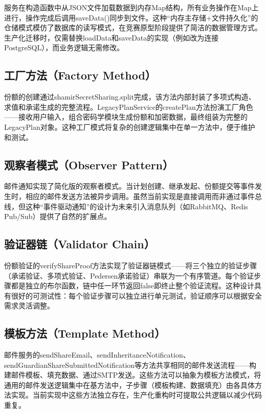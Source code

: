 \documentclass[UTF8,a4paper,zihao=-4,openany]{ctexrep}
\begin{document}
服务在构造函数中从JSON文件加载数据到内存Map结构，所有业务操作在Map上进行，操作完成后调用saveData()同步到文件。这种“内存主存储+文件持久化”的仓储模式模仿了数据库的读写模式，在竞赛原型阶段提供了简洁的数据管理方式。生产化迁移时，仅需替换loadData和saveData的实现（例如改为连接PostgreSQL），而业务逻辑无需修改。

\subsection{工厂方法（Factory Method）}

份额的创建通过shamirSecretSharing.split完成，该方法内部封装了多项式构造、求值和承诺生成的完整流程。LegacyPlanService的createPlan方法扮演工厂角色——接收用户输入，组合密码学模块生成份额和加密数据，最终组装为完整的LegacyPlan对象。这种工厂模式将复杂的创建逻辑集中在单一方法中，便于维护和测试。

\subsection{观察者模式（Observer Pattern）}

邮件通知实现了简化版的观察者模式。当计划创建、继承发起、份额提交等事件发生时，相应的邮件发送方法被异步调用。虽然当前实现是直接调用而非通过事件总线，但这种“事件驱动通知”的设计为未来引入消息队列（如RabbitMQ、Redis Pub/Sub）提供了自然的扩展点。

\subsection{验证器链（Validator Chain）}

份额验证的verifyShareProof方法实现了验证器链模式——将三个独立的验证步骤（承诺验证、多项式验证、Pedersen承诺验证）串联为一个有序管道。每个验证步骤都是独立的布尔函数，链中任一环节返回false即终止整个验证流程。这种设计具有很好的可测试性：每个验证步骤可以独立进行单元测试，验证顺序可以根据安全需求灵活调整。

\subsection{模板方法（Template Method）}

邮件服务的sendShareEmail、sendInheritanceNotification、sendGuardianShareSubmittedNotification等方法共享相同的邮件发送流程——构建邮件模板、填充数据、通过SMTP发送。这些方法可以抽象为模板方法模式，将通用的邮件发送逻辑集中在基方法中，子步骤（模板构建、数据填充）由各具体方法实现。当前实现中这些方法独立存在，生产化重构时可提取公共逻辑以减少代码重复。
\end{document}
